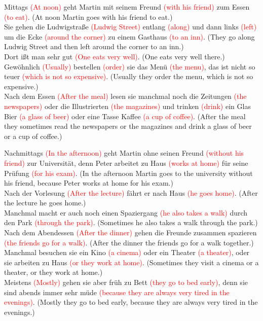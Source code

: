 \documentclass{article}
\begin{document}
Mittags \textcolor{red}{(At noon)} geht Martin mit seinem Freund \textcolor{red}{(with his friend)} zum Essen \textcolor{red}{(to eat)}. (At noon Martin goes with his friend to eat.)\\
Sie gehen die Ludwigstraße \textcolor{red}{(Ludwig Street)} entlang \textcolor{red}{(along)} und dann links \textcolor{red}{(left)} um die Ecke \textcolor{red}{(around the corner)} zu einem Gasthaus \textcolor{red}{(to an inn)}. (They go along Ludwig Street and then left around the corner to an inn.)\\
Dort ißt man sehr gut \textcolor{red}{(One eats very well)}. (One eats very well there.)\\
Gewöhnlich \textcolor{red}{(Usually)} bestellen \textcolor{red}{(order)} sie das Menü \textcolor{red}{(the menu)}, das ist nicht so teuer \textcolor{red}{(which is not so expensive)}. (Usually they order the menu, which is not so expensive.)\\
Nach dem Essen \textcolor{red}{(After the meal)} lesen sie manchmal noch die Zeitungen \textcolor{red}{(the newspapers)} oder die Illustrierten \textcolor{red}{(the magazines)} und trinken \textcolor{red}{(drink)} ein Glas Bier \textcolor{red}{(a glass of beer)} oder eine Tasse Kaffee \textcolor{red}{(a cup of coffee)}. (After the meal they sometimes read the newspapers or the magazines and drink a glass of beer or a cup of coffee.)

Nachmittags \textcolor{red}{(In the afternoon)} geht Martin ohne seinen Freund \textcolor{red}{(without his friend)} zur Universität, denn Peter arbeitet zu Haus \textcolor{red}{(works at home)} für seine Prüfung \textcolor{red}{(for his exam)}. (In the afternoon Martin goes to the university without his friend, because Peter works at home for his exam.)\\
Nach der Vorlesung \textcolor{red}{(After the lecture)} fährt er nach Haus \textcolor{red}{(he goes home)}. (After the lecture he goes home.)\\
Manchmal macht er auch noch einen Spaziergang \textcolor{red}{(he also takes a walk)} durch den Park \textcolor{red}{(through the park)}. (Sometimes he also takes a walk through the park.)\\
Nach dem Abendessen \textcolor{red}{(After the dinner)} gehen die Freunde zusammen spazieren \textcolor{red}{(the friends go for a walk)}. (After the dinner the friends go for a walk together.)\\
Manchmal besuchen sie ein Kino \textcolor{red}{(a cinema)} oder ein Theater \textcolor{red}{(a theater)}, oder sie arbeiten zu Haus \textcolor{red}{(or they work at home)}. (Sometimes they visit a cinema or a theater, or they work at home.)\\
Meistens \textcolor{red}{(Mostly)} gehen sie aber früh zu Bett \textcolor{red}{(they go to bed early)}, denn sie sind abends immer sehr müde \textcolor{red}{(because they are always very tired in the evenings)}. (Mostly they go to bed early, because they are always very tired in the evenings.)
\end{document}
